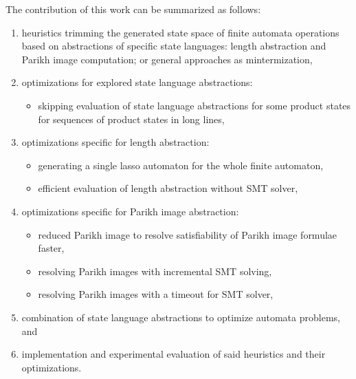 The contribution of this work can be summarized as follows:
\begin{enumerate}
    \item heuristics trimming the generated state space of finite automata operations based on abstractions of specific state languages: length abstraction and Parikh image computation; or general approaches as mintermization,

    \item optimizations for explored state language abstractions:
    \begin{itemize}
        \item skipping evaluation of state language abstractions for some product states for sequences of product states in long lines,
    \end{itemize}

    \item optimizations specific for length abstraction:
    \begin{itemize}
        \item generating a single lasso automaton for the whole finite automaton,
        \item efficient evaluation of length abstraction without SMT solver,
    \end{itemize}

    \item optimizations specific for Parikh image abstraction:
    \begin{itemize}
        \item reduced Parikh image to resolve satisfiability of Parikh image formulae faster,
        \item resolving Parikh images with incremental SMT solving,
        \item resolving Parikh images with a timeout for SMT solver,
    \end{itemize}

    \item combination of state language abstractions to optimize automata problems, and

    \item implementation and experimental evaluation of said heuristics and their optimizations.
\end{enumerate}


